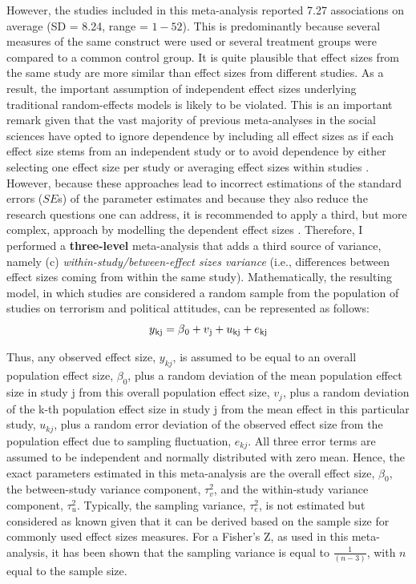However, the studies included in this meta-analysis reported 7.27 associations on average (SD = 8.24, range = $1-52$). This is predominantly because several measures of the same construct were used or several treatment groups were compared to a common control group. It is quite plausible that effect sizes from the same study are more similar than effect sizes from different studies. As a result, the important assumption of independent effect sizes underlying traditional random-effects models is likely to be violated. This is an important remark given that the vast majority of previous meta-analyses in the social sciences have opted to ignore dependence by including all effect sizes as if each effect size stems from an independent study \citep[e.g.,][]{Jost2017a} or to avoid dependence by either selecting one effect size per study or averaging effect sizes within studies \cite[e.g.,][]{Burke2013, Pettigrew2006}. However, because these approaches lead to incorrect estimations of the standard errors ($SE$s) of the parameter estimates and because they also reduce the research questions one can address, it is recommended to apply a third, but more complex, approach by modelling the dependent effect sizes \citep{VandenNoortgate2013}. Therefore, I performed a \textbf{three-level} meta-analysis that adds a third source of variance, namely (c) \textit{within-study/between-effect sizes variance} (i.e., differences between effect sizes coming from within the same study). Mathematically, the resulting model, in which studies are considered a random sample from the population of studies on terrorism and political attitudes, can be represented as follows:
\begin{equation}
y\textsubscript{kj} = \beta\textsubscript{0} + v\textsubscript{j} + u\textsubscript{kj} + e\textsubscript{kj}
\end{equation}

Thus, any observed effect size, $y_{kj}$, is assumed to be equal to an overall population effect size, $\beta_0$, plus a random deviation of the mean population effect size in study j from this overall population effect size, $v_j$, plus a random deviation of the k-th population effect size in study j from the mean effect in this particular study, $u_{kj}$, plus a random error deviation of the observed effect size from the population effect due to sampling fluctuation, $e_{kj}$. All three error terms are assumed to be independent and normally distributed with zero mean. Hence, the exact parameters estimated in this meta-analysis are the overall effect size, $\beta_0$, the between-study variance component, $\tau_{v}^2$, and the within-study variance component, $\tau_{u}^2$. Typically, the sampling variance, $\tau_{e}^2$, is not estimated but considered as known given that it can be derived based on the sample size for commonly used effect sizes measures. For a Fisher’s Z, as used in this meta-analysis, it has been shown that the sampling variance is equal to $\frac{1}{(n - 3)}$, with $n$ equal to the sample size.



